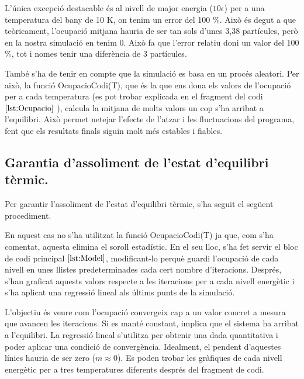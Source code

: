 \documentclass[a4paper,10.5pt]{report}
\begin{document}
L'única excepció destacable és al nivell de major energia ($10\epsilon$) per a una temperatura del bany de 10 K, on tenim un error del 100 $\%$. Això és degut a que teòricament, l'ocupació mitjana hauria de ser tan sols d'unes 3,38 partícules, però en la nostra simulació en tenim 0. Això fa que l'error relatiu doni un valor del 100 $\%$, tot i nomes tenir una diferència de 3 partícules. 

També s'ha de tenir en compte que la simulació es basa en un procés aleatori. Per això, la funció OcupacioCodi(T), que és la que ens dona els valors de l'ocupació per a cada temperatura (es pot trobar explicada en el fragment del codi $\ref{lst:Ocupacio}$ ), calcula la mitjana de molts valors un cop s'ha arribat a l'equilibri. Això permet netejar l'efecte de l'atzar i les fluctuacions del programa, fent que els resultats finals siguin molt més estables i fiables. 


\subsection{Garantia d'assoliment de l'estat d'equilibri tèrmic.}

Per garantir l'assoliment de l'estat d'equilibri tèrmic, s'ha seguit el següent procediment.

En aquest cas no s'ha utilitzat la funció OcupacioCodi(T) ja que, com s'ha comentat, aquesta elimina el soroll estadístic. En el seu lloc, s'ha fet servir el bloc de codi principal $\ref{lst:Model}$, modificant-lo perquè guardi l'ocupació de cada nivell en unes llistes predeterminades cada cert nombre d'iteracions. Després, s'han graficat aquests valors respecte a les iteracions per a cada nivell energètic i s'ha aplicat una regressió lineal als últims punts de la simulació.

L'objectiu és veure com l'ocupació convergeix cap a un valor concret a mesura que avancen les iteracions. Si es manté constant, implica que el sistema ha arribat a l'equilibri. La regressió lineal s'utilitza per obtenir una dada quantitativa i poder aplicar una condició de convergència. Idealment, el pendent d'aquestes línies hauria de ser zero ($m \approx 0$). Es poden trobar les gràfiques de cada nivell energètic per a tres temperatures diferents després del fragment de codi. 
\end{document}
